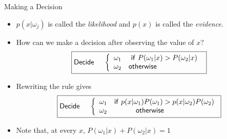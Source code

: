 \begin{frame}{Making a Decision}
\begin{itemize}
\item $p(x|\omega_j)$ is called the \textit{\color{mycolor1}likelihood} and $p(x)$ is called the \textit{\color{mycolor1}evidence}.
\item How can we make a decision after observing the value of $x$?
\begin{equation}
\boxed{{\sf Decide}~~~~\left\{ {\begin{array}{*{20}{c}}
{{\omega_1}}&{{\sf if}~P({\omega_1}|x) > P({\omega_2}|x)}\\
{{\omega_2}}&{\sf otherwise~~~~~~~~~~~~~~~~~~}
\end{array}} \right.\nonumber}
\end{equation}
\item Rewriting the rule gives
\begin{equation}
\boxed{{\sf Decide}~~~~\left\{ {\begin{array}{*{20}{c}}
{{\omega_1}}&{{\sf if}~{p(x|\omega_1)P(\omega_1)}>{p(x|\omega_2)P(\omega_2)}}\\
{{\omega_2}}&{\sf otherwise~~~~~~~~~~~~}
\end{array}} \right.\nonumber}
\end{equation}
\item Note that, at every $x$, $P(\omega_1|x)+P(\omega_2|x)=1$
\end{itemize}
\end{frame}


